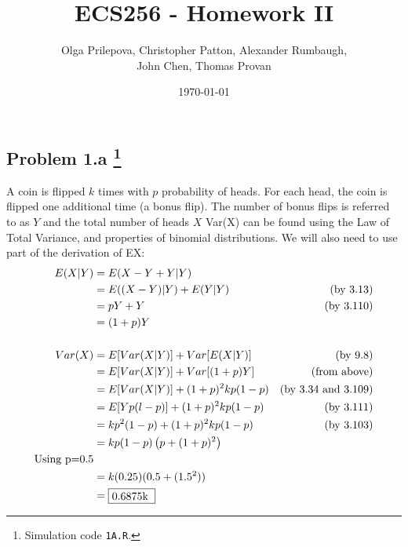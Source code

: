 \documentclass[letter]{article}
\author{Olga Prilepova, Christopher Patton, Alexander Rumbaugh, \\ John Chen, Thomas Provan}
\date{\today}
\title{ECS256 - Homework II}
\newcounter{foot}
\begin{document}
\maketitle

\subsection*{Problem 1.a
\footnote{Simulation code \texttt{1A.R}.}}
A coin is flipped $k$ times with $p$ probability of heads. For each head, the coin is flipped one additional time (a bonus flip). The number of bonus flips is referred to as $Y$ and the total number of heads $X$\newline
\newline
Var(X) can be found using the Law of Total Variance, and properties of binomial distributions. We will also need to use part of the derivation of EX:
\begin{equation*}
	\begin{aligned}
	E(X|Y)&= E({X - Y} + Y | Y)\\
	  &= E((X-Y)|Y) + E(Y|Y) &(\textrm{by 3.13})\\
	  &= pY + Y &(\textrm{by 3.110})\\
	  &= (1+p)Y\\
	  \\
	Var(X)	&= E[Var(X|Y)] + Var[E(X|Y)]	&(\textrm{by 9.8})\\
			&= E[Var(X|Y)] + Var[(1+p)Y]	&(\textrm{from above})\\
			&= E[Var(X|Y)] + (1+p)^{2}kp(1-p) &(\textrm{by 3.34 and 3.109})\\
			&= E[Yp(l-p)]  + (1+p)^{2}kp(1-p) &(\textrm{by 3.111})\\
			&= kp^{2}(1-p) + (1+p)^{2}kp(1-p) &(\textrm{by 3.103}) \\
			&= kp(1-p)\left(p+(1+p)^2\right)\\
			\textrm{Using p=0.5} \\
			&= k(0.25)(0.5+(1.5^{2}))\\
			&= {\fbox {\parbox{0.5in}{0.6875k}}}\\
	\end{aligned}
\end{equation*}
\end{document}
